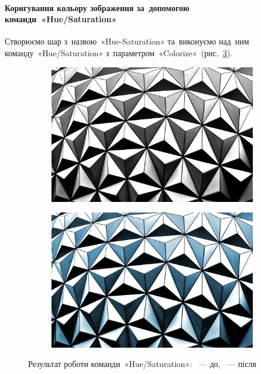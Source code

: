 \documentclass[
	a4paper,
	oneside,
	BCOR = 10mm,
	DIV = 12,
	12pt,
	headings = normal,
]{scrartcl}
\begin{document}
		\paragraph{Коригування кольору зображення за~допомогою команди~\textenglish{«Hue/\-Sat\-u\-ra\-tion»}}
			Створюємо шар з~назвою~\textenglish{«Hue-\-Sat\-u\-ra\-tion»} та~виконуємо над~ним команду~\textenglish{«Hue/\-Sat\-u\-ra\-tion»} з~параметром~\textenglish{«Colorize»}~(рис.~\ref{fig:01-huesat}).
			\begin{figure}[!htbp]
				\centering
				\begin{subfigure}{0.5\columnwidth}
					\centering
					\includegraphics[height = 6\baselineskip]{./assets/abstract-abstract-photo-art-1070345.jpg}
					\caption{}
					\label{subfig:01-01-huesat}
				\end{subfigure}%
				\begin{subfigure}{0.5\columnwidth}
					\centering
					\includegraphics[height = 6\baselineskip]{./assets/y03s01-multimedia-lab-01-p01-01-huesat.jpg}
					\caption{}
					\label{subfig:01-02-huesat}
				\end{subfigure}%
				\caption{Результат роботи команди~\textenglish{«Hue/Saturation»}: ~— до, ~— після}
				\label{fig:01-huesat}
			\end{figure}
\end{document}
